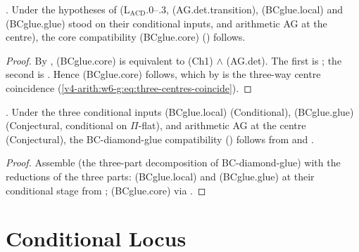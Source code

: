 \begin{corollary}
\label{v4-arith:w6-g:cor:bcglue-core-closed}
\ClaimStatusProvedHereConditional. Under the hypotheses of
(L\(_{\mathrm{ACD}}\).\(0\)--.\(3\), (AG.det.transition),
(BCglue.local) and (BCglue.glue) stood on their conditional inputs,
and arithmetic AG at the centre), the core compatibility
(BCglue.core) () follows.
\end{corollary}

\begin{proof}
By , (BCglue.core)
is equivalent to (Ch1) \(\wedge\) (AG.det). The first is
; the second is
. Hence (BCglue.core)
follows, which by  is
the three-way centre coincidence
(\ref{v4-arith:w6-g:eq:three-centres-coincide}).
\end{proof}

\begin{corollary}
\label{v4-arith:w6-g:cor:bcglue-final}
\ClaimStatusConditional. Under the three conditional inputs
(BCglue.local) (Conditional), (BCglue.glue) (Conjectural,
conditional on \(\Pi\)-flat), and arithmetic AG at the centre
(Conjectural), the BC-diamond-glue compatibility
() follows from
 and
.
\end{corollary}

\begin{proof}
Assemble  (the three-part
decomposition of BC-diamond-glue) with the reductions of the three
parts: (BCglue.local) and (BCglue.glue) at their conditional stage
from ; (BCglue.core) via
.
\end{proof}

\section{Conditional Locus}
\label{v4-arith:w6-g:residuals}

